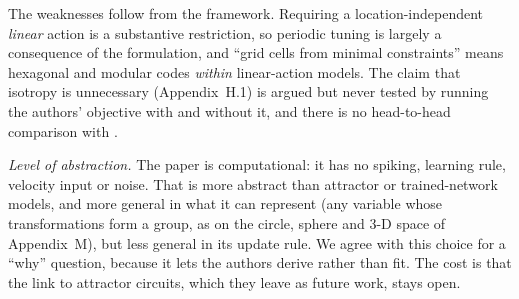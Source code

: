 \documentclass[10pt,letterpaper]{article}
\begin{document}
The weaknesses follow from the framework. Requiring a location-independent \emph{linear} action is a substantive restriction, so periodic tuning is largely a consequence of the formulation, and ``grid cells from minimal constraints'' means hexagonal and modular codes \emph{within} linear-action models. The claim that isotropy is unnecessary (Appendix~H.1) is argued but never tested by running the authors' objective with and without it, and there is no head-to-head comparison with \citet{sorscher2019}.

\emph{Level of abstraction.} The paper is computational: it has no spiking, learning rule, velocity input or noise. That is more abstract than attractor or trained-network models, and more general in what it can represent (any variable whose transformations form a group, as on the circle, sphere and 3-D space of Appendix~M), but less general in its update rule. We agree with this choice for a ``why'' question, because it lets the authors derive rather than fit. The cost is that the link to attractor circuits, which they leave as future work, stays open.
\end{document}
